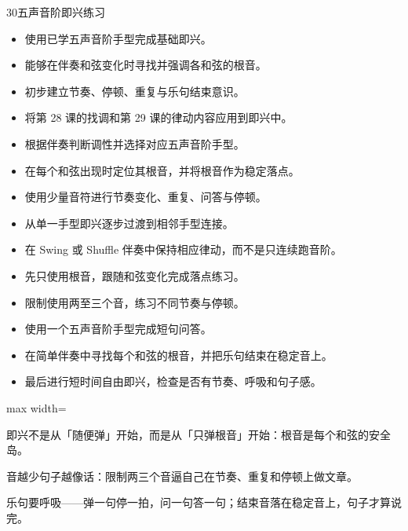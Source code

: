 \begin{lessoncard}{30}{五声音阶即兴练习}
\begin{itemize}
\item 使用已学五声音阶手型完成基础即兴。
\item 能够在伴奏和弦变化时寻找并强调各和弦的根音。
\item 初步建立节奏、停顿、重复与乐句结束意识。
\item 将第 28 课的找调和第 29 课的律动内容应用到即兴中。
\end{itemize}
\begin{itemize}
\item 根据伴奏判断调性并选择对应五声音阶手型。
\item 在每个和弦出现时定位其根音，并将根音作为稳定落点。
\item 使用少量音符进行节奏变化、重复、问答与停顿。
\item 从单一手型即兴逐步过渡到相邻手型连接。
\item 在 Swing 或 Shuffle 伴奏中保持相应律动，而不是只连续跑音阶。
\end{itemize}
\begin{itemize}
\item 先只使用根音，跟随和弦变化完成落点练习。
\item 限制使用两至三个音，练习不同节奏与停顿。
\item 使用一个五声音阶手型完成短句问答。
\item 在简单伴奏中寻找每个和弦的根音，并把乐句结束在稳定音上。
\item 最后进行短时间自由即兴，检查是否有节奏、呼吸和句子感。
\end{itemize}
\begin{fignote}
\begin{center}
\begin{adjustbox}{max width=\textwidth}
\steparrow
{}\steparrow
{}\steparrow
{}\steparrow
{}
\end{adjustbox}
\end{center}
\begin{fignotes}
\item 即兴不是从「随便弹」开始，而是从「只弹根音」开始：根音是每个和弦的安全岛。
\item 音越少句子越像话：限制两三个音逼自己在节奏、重复和停顿上做文章。
\item 乐句要呼吸——弹一句停一拍，问一句答一句；结束音落在稳定音上，句子才算说完。
\end{fignotes}
\end{fignote}
\end{lessoncard}
